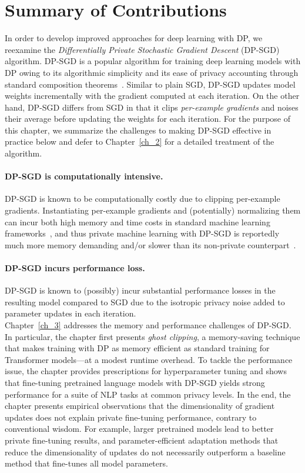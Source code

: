 \section{Summary of Contributions}\label{sec:overview_of_results}

In order to develop improved approaches for deep learning with DP, we reexamine the \emph{Differentially Private Stochastic Gradient Descent} (DP-SGD) algorithm.
DP-SGD is a popular algorithm for training deep learning models with DP owing to its algorithmic simplicity and its ease of privacy accounting through standard composition theorems~\cite{dwork2014algorithmic}.
Similar to plain SGD, DP-SGD updates model weights incrementally with the gradient computed at each iteration.
On the other hand, DP-SGD differs from SGD in that it clips \emph{per-example gradients} and noises their average before updating the weights for each iteration. 
For the purpose of this chapter, we summarize the challenges to making DP-SGD effective in practice below and defer to Chapter~\ref{ch_2} for a detailed treatment of the algorithm. 

\paragraph{DP-SGD is computationally intensive.} DP-SGD is known to be computationally costly due to clipping per-example gradients.
Instantiating per-example gradients and (potentially) normalizing them can incur both high memory and time costs in standard machine learning frameworks~\citep{paszke2019pytorch,frostig2018compiling}, and thus private machine learning with DP-SGD is reportedly much more memory demanding and/or slower than its non-private counterpart~\citep{carlini2019secret,hoory2021learning}. 

\paragraph{DP-SGD incurs performance loss.}
DP-SGD is known to (possibly) incur substantial performance losses in the resulting model compared to SGD due to the isotropic privacy noise added to parameter updates in each iteration.\\

Chapter~\ref{ch_3} addresses the memory and performance challenges of DP-SGD.
In particular, the chapter first presents \emph{ghost clipping}, a memory-saving technique that makes training with DP as memory efficient as standard training for Transformer models---at a modest runtime overhead.
To tackle the performance issue, the chapter provides prescriptions for hyperparameter tuning and shows that fine-tuning pretrained language models with DP-SGD yields strong performance for a suite of NLP tasks at common privacy levels.
In the end, the chapter presents empirical observations that the dimensionality of gradient updates does not explain private fine-tuning performance, contrary to conventional wisdom.
For example, larger pretrained models lead to better private fine-tuning results, and parameter-efficient adaptation methods that reduce the dimensionality of updates do not necessarily outperform a baseline method that fine-tunes all model parameters.

